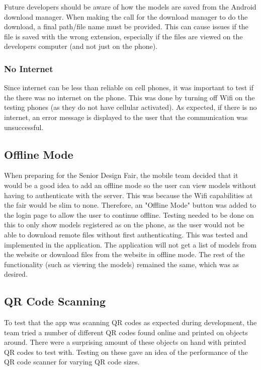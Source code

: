                 Future developers should be aware of how the models are saved from the Android download manager.  When making the call for the download manager to do the download, a final path/file name must be provided.  This can cause issues if the file is saved with the wrong extension, especially if the files are viewed on the developers computer (and not just on the phone).
        
        \subsubsection{No Internet}

            Since internet can be less than reliable on cell phones, it was important to test if the there was no internet on the phone.  This was done by turning off Wifi on the testing phones (as they do not have cellular activated).  As expected, if there is no internet, an error message is displayed to the user that the communication was unsuccessful.
        
    \subsection{Offline Mode}
        
        When preparing for the Senior Design Fair, the mobile team decided that it would be a good idea to add an offline mode so the user can view models without having to authenticate with the server.  This was because the Wifi capabilities at the fair would be slim to none.  Therefore, an "Offline Mode" button was added to the login page to allow the user to continue offline.  Testing needed to be done on this to only show models registered as on the phone, as the user would not be able to download remote files without first authenticating.  This was tested and implemented in the application.  The application will not get a list of models from the website or download files from the website in offline mode.  The rest of the functionality (such as viewing the models) remained the same, which was as desired.

    \subsection{QR Code Scanning}
        
        To test that the app was scanning QR codes as expected during development, the team tried a number of different QR codes found online and printed on objects around. There were a surprising amount of these objects on hand with printed QR codes to test with. Testing on these gave an idea of the performance of the QR code scanner for varying QR code sizes.

